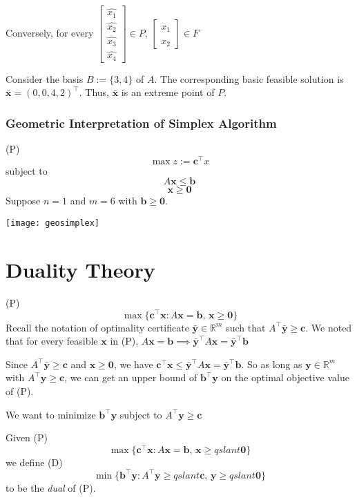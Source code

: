 Conversely, for every 
$ \begin{bmatrix}
    \hat{x_1}\\
    \hat{x_2}\\
    \hat{x_3}\\
    \hat{x_4}
\end{bmatrix}\in P $,
$ \begin{bmatrix}
    \hat{x_1}\\
    \hat{x_2}
\end{bmatrix}\in F $

Consider the basis $ B:=\{3,4\} $ of $ A $. The corresponding basic feasible
solution is $ \bm{\bar{x}}=(0,0,4,2)^\top $. Thus, $ \bm{\bar{x}} $ is
an extreme point of $ P $.

\subsection{Geometric Interpretation of Simplex Algorithm}
(P)
\[ \max z:=\bm{c}^\top x \]
subject to
\[ A \bm{x}\leqslant \bm{b} \]
\[ \bm{x}\geqslant  \bm{0} \]
Suppose $ n=1 $ and $ m=6 $ with $ \bm{b}\geqslant  \bm{0} $.

\begin{center}
    \texttt{[image: geosimplex]}
\end{center}

\chapter{Duality Theory}
(P)
\[ \max \{\bm{c}^{\top} \bm{x}: A \bm{x}=\bm{b},\, \bm{x} \geqslant  \bm{0}\} \]
Recall the notation of optimality certificate $ \bm{\bar{y}}\in\mathbb{R}^m $ such that $ A ^\top \bm{\bar{y}}\geqslant  \bm{c} $. We noted that for
every feasible $ \bm{x} $ in (P), $ A \bm{x}= \bm{b}\implies
\bm{\bar{y}}^\top A \bm{x}=\bm{\bar{y}}^\top \bm{b} $

Since $ A ^\top \bm{\bar{y}}\geqslant  \bm{c} $ and $ \bm{x}\geqslant  \bm{0} $,
we have $ \bm{c}^\top \bm{x}\leqslant \bm{\bar{y}}^\top A \bm{x} =
\bm{\bar{y}}^\top \bm{b} $. So as long as $ \bm{y}\in\mathbb{R}^m $
with $ A ^\top \bm{y}\geqslant  \bm{c} $, we can get an upper bound
of $ \bm{b} ^\top\bm{y} $ on the optimal objective value of (P).

We want to minimize $ \bm{b}^\top\bm{y} $ subject to $ A ^\top \bm{y}\geqslant  \bm{c} $

\begin{defbox}
    \begin{definition}
        Given (P)
        \[ \max \{\bm{c}^{\top} \bm{x}: A \bm{x}=\bm{b},\, \bm{x} \geqslant qslant  \bm{0}\} \]
        we define (D)
        \[ \min \{\bm{b}^{\top} \bm{y}: A^{\top} \bm{y} \geqslant qslant  \bm{c},\, \bm{y} \geqslant qslant  \bm{0}\}\]
        to be the \emph{dual} of (P).
    \end{definition}
\end{defbox}

